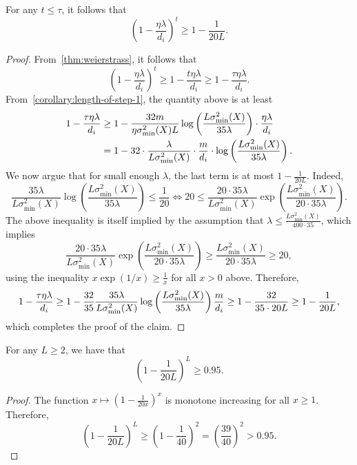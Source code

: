 \begin{lemma}
  \label{lemma:contraction-factor-small-phase-1}
    For any $t \leq \tau$, it follows that
    \[
        \left(1 - \frac{\eta \lambda}{d_i} \right)^t \geq 1 - \frac{1}{20L}.
    \]
\end{lemma}
\begin{proof}
    From~\cref{thm:weierstrass}, it follows that
    \[
        \left( 1 - \frac{\eta \lambda}{d_i} \right)^{t} \geq
        1 - \frac{t \eta \lambda}{d_i}
        \geq 1 - \frac{\tau \eta \lambda}{d_i}.
    \]
    From~\cref{corollary:length-of-step-1}, the quantity above is at least
    \begin{align*}
        1 - \frac{\tau \eta \lambda}{d_i} &\geq
        1 - \frac{32 m}{\eta \sigma_{\min}^2(X) L} \log\left(
          \frac{L \sigma_{\min}^2(X)}{35 \lambda}
        \right) \cdot \frac{\eta \lambda}{d_i} \\
        &=
        1 - 32 \cdot \frac{\lambda}{L \sigma_{\min}^2(X)} \cdot
        \frac{m}{d_i} \cdot
        \log\left(
            \frac{L \sigma_{\min}^2(X)}{35 \lambda}
        \right).
    \end{align*}
    We now argue that for small enough $\lambda$,
    the last term is at most $1 - \frac{1}{20L}$.
    Indeed,
    \[
        \frac{35 \lambda}{L \sigma_{\min}^2(X)} \log \left(
          \frac{L \sigma_{\min}^2(X)}{35 \lambda}
        \right)
        \leq \frac{1}{20}
        \Leftrightarrow
        20
        \leq
        \frac{20 \cdot 35 \lambda}{L \sigma_{\min}^2(X)} \exp\left(\frac{L \sigma_{\min}^2(X)}{20 \cdot 35 \lambda}\right).
    \]
    The above inequality is itself implied by the assumption that $\lambda \leq 
        \frac{L \sigma_{\min}^2(X)}{400 \cdot 35}$, which implies
    \[
        \frac{20 \cdot 35 \lambda}{L \sigma_{\min}^2(X)} \exp\left(\frac{L \sigma_{\min}^2(X)}{20 \cdot 35 \lambda}\right)
        \geq
        \frac{L \sigma_{\min}^2(X)}{20 \cdot 35 \lambda} \geq 20,
    \]
    using the inequality $x \exp(1 / x) \geq \frac{1}{x}$ for all $x > 0$ above.
    Therefore,
    \[
        1 - \frac{\tau \eta \lambda}{d_i} \geq
        1 - \frac{32}{35} \frac{35 \lambda}{L \sigma_{\min}^2(X)} \log\left(\frac{L \sigma_{\min}^2(X)}{35 \lambda}\right)
        \frac{m}{d_i}
        \geq
        1 - \frac{32}{35 \cdot 20 L} \geq 1 - \frac{1}{20 L},
    \]
    which completes the proof of the claim.
\end{proof}
\begin{lemma}
    \label{lemma:small-contraction-factor-lower-bound}
    For any $L \geq 2$, we have that
    \[
        \left(1 - \frac{1}{20 L} \right)^{L}
        \geq 0.95.
    \]
\end{lemma}
\begin{proof}
    The function $x \mapsto \left(1 - \frac{1}{20x}\right)^{x}$ is monotone increasing for
    all $x \geq 1$. Therefore, 
    \[
        \left(1 - \frac{1}{20L}\right)^{L} \geq \left( 1 - \frac{1}{40} \right)^{2}
        = \left( \frac{39}{40} \right)^2 > 0.95.
    \]
\end{proof}

